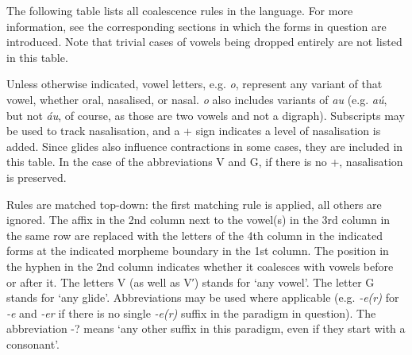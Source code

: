 \documentclass[a4paper, 12pt, twoside, final]{article}
\let \w \textit
\begin{document}
\noindent The following table lists all coalescence rules in the language. For more information, see the corresponding
sections in which the forms in question are introduced. Note that trivial cases of vowels being dropped entirely
are not listed in this table.

Unless otherwise indicated, vowel letters, e.g. \w{o}, represent any variant of that vowel, whether oral, nasalised, or nasal.
\w{o} also includes variants of \w{au} (e.g. \w{aú}, but not \w{áu}, of course, as those are two vowels and not a digraph).
Subscripts may be used to track nasalisation, and a + sign indicates a level of nasalisation is added. Since glides also
influence contractions in some cases, they are included in this table. In the case of the abbreviations V and G, if there
is no +, nasalisation is preserved.

Rules are matched top-down: the first matching rule is applied, all others are ignored. The affix in the 2nd column next to the
vowel(s) in the 3rd column in the same row are replaced with the letters of the 4th column in the indicated forms at the
indicated morpheme boundary in the 1st column. The position in the hyphen in the 2nd column indicates whether it coalesces
with vowels before or after it. The letters V (as well as V′) stands for ‘any vowel’. The letter G stands for
‘any glide’. Abbreviations may be used where applicable (e.g. \w{-e(r)} for \w{-e} and \w{-er} if there is no single \w{-e(r)}
suffix in the paradigm in question). The abbreviation -? means ‘any other suffix in this paradigm, even if they
start with a consonant’.
\end{document}
